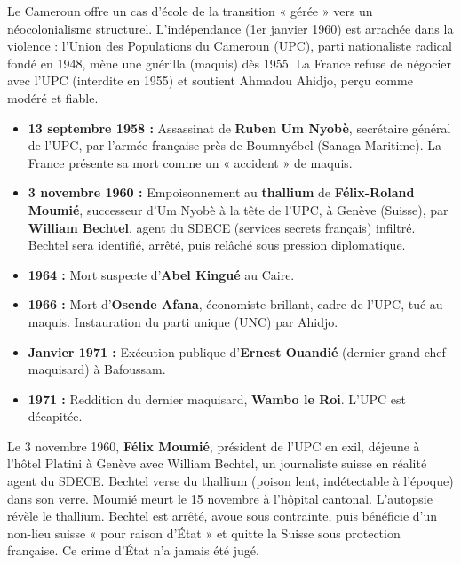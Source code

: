 \documentclass[11pt]{article}
\begin{document}
Le Cameroun offre un cas d'école de la transition « gérée » vers un néocolonialisme structurel. L'indépendance (1er janvier 1960) est arrachée dans la violence : l'Union des Populations du Cameroun (UPC), parti nationaliste radical fondé en 1948, mène une guérilla (maquis) dès 1955. La France refuse de négocier avec l'UPC (interdite en 1955) et soutient Ahmadou Ahidjo, perçu comme modéré et fiable.

\begin{experience}
\begin{itemize}
    \item \textbf{13 septembre 1958 :} Assassinat de \textbf{Ruben Um Nyobè}, secrétaire général de l'UPC, par l'armée française près de Boumnyébel (Sanaga-Maritime). La France présente sa mort comme un « accident » de maquis.
    \item \textbf{3 novembre 1960 :} Empoisonnement au \textbf{thallium} de \textbf{Félix-Roland Moumié}, successeur d'Um Nyobè à la tête de l'UPC, à Genève (Suisse), par \textbf{William Bechtel}, agent du SDECE (services secrets français) infiltré. Bechtel sera identifié, arrêté, puis relâché sous pression diplomatique.
    \item \textbf{1964 :} Mort suspecte d'\textbf{Abel Kingué} au Caire.
    \item \textbf{1966 :} Mort d'\textbf{Osende Afana}, économiste brillant, cadre de l'UPC, tué au maquis. Instauration du parti unique (UNC) par Ahidjo.
    \item \textbf{Janvier 1971 :} Exécution publique d'\textbf{Ernest Ouandié} (dernier grand chef maquisard) à Bafoussam.
    \item \textbf{1971 :} Reddition du dernier maquisard, \textbf{Wambo le Roi}. L'UPC est décapitée.
\end{itemize}
\end{experience}

\begin{savaistu}
Le 3 novembre 1960, \textbf{Félix Moumié}, président de l'UPC en exil, déjeune à l'hôtel Platini à Genève avec William Bechtel, un journaliste suisse en réalité agent du SDECE. Bechtel verse du thallium (poison lent, indétectable à l'époque) dans son verre. Moumié meurt le 15 novembre à l'hôpital cantonal. L'autopsie révèle le thallium. Bechtel est arrêté, avoue sous contrainte, puis bénéficie d'un non-lieu suisse « pour raison d'État » et quitte la Suisse sous protection française. Ce crime d'État n'a jamais été jugé.
\end{savaistu}
\end{document}

